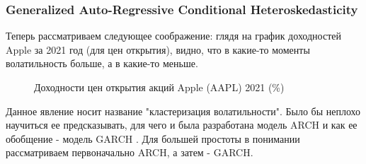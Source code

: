 \subsubsection{Generalized Auto-Regressive Conditional Heteroskedasticity} \label{link::garch_block}
Теперь рассматриваем следующее соображение: глядя на график доходностей Apple за 2021 год (для цен открытия), видно, что в какие-то моменты волатильность больше, а в какие-то меньше. 
\begin{figure}[H]
	\centering
	\caption{Доходности цен открытия акций Apple (AAPL) 2021 (\%)}
	\label{fig::apple_returns_2021}
\end{figure}
Данное явление носит название "кластеризация волатильности". Было бы неплохо научиться ее предсказывать, для чего и была разработана модель ARCH \cite{robert1982arch} и как ее обобщение - модель GARCH \cite{bollerslev1986garch}. Для большей простоты в понимании рассматриваем первоначально ARCH, а затем - GARCH.
